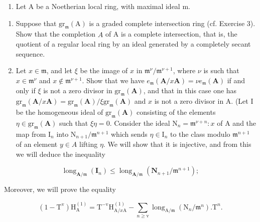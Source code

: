 \begin{enumerate}
\def\labelenumi{\arabic{enumi})}
\setcounter{enumi}{3}
\tightlist
\item
  Let A be a Noetherian local ring, with maximal ideal m.
\end{enumerate}

\begin{enumerate}
\def\labelenumi{\alph{enumi})}
\item
  Suppose that \(\mathrm{gr}_{\mathfrak{m}}(\mathrm{A})\) is a graded complete intersection ring (cf. Exercise 3). Show that the completion \(\widehat{A}\) of A is a complete intersection, that is, the quotient of a regular local ring by an ideal generated by a completely secant sequence.
\item
  Let \(x \in \mathfrak{m}\), and let \(\xi\) be the image of \(x\) in \(\mathfrak{m}^{\nu}/\mathfrak{m}^{\nu+1}\), where \(\nu\) is such that \(x \in \mathfrak{m}^{\nu}\) and \(x \notin \mathfrak{m}^{\nu+1}\). Show that we have \(e_{\mathfrak{m}}(\mathbf{A}/x\mathbf{A}) = \nu e_{\mathfrak{m}}(\mathbf{A})\) if and only if \(\xi\) is not a zero divisor in \(\mathrm{gr}_{\mathfrak{m}}(\mathbf{A})\), and that in this case one has \(\mathrm{gr}_{\mathfrak{m}}(\mathbf{A}/x\mathbf{A}) = \mathrm{gr}_{\mathfrak{m}}(\mathbf{A})/\xi\mathrm{gr}_{\mathfrak{m}}(\mathbf{A})\) and \(x\) is not a zero divisor in A. (Let I be the homogeneous ideal of \(\mathrm{gr}_{\mathfrak{m}}(\mathbf{A})\) consisting of the elements \(\eta \in \mathrm{gr}_{\mathfrak{m}}(\mathbf{A})\) such that \(\xi\eta = 0\). Consider the ideal \(\mathrm{N}_n = \mathfrak{m}^{\nu+n}:x\) of A and the map from \(\mathrm{I}_n\) into \(\mathrm{N}_{n+1}/\mathfrak{m}^{n+1}\) which sends \(\eta \in \mathrm{I}_n\) to the class modulo \(\mathfrak{m}^{n+1}\) of an element \(y \in A\) lifting \(\eta\). We will show that it is injective, and from this we will deduce the inequality
\end{enumerate}

\[
\operatorname{long} _ {\mathbf {A} / \mathfrak {m}} (\mathbf {I} _ {n}) \leqslant \operatorname{long} _ {\mathbf {A} / \mathfrak {m}} (\mathbf {N} _ {n + 1} / \mathfrak {m} ^ {n + 1});\tag{i}
\]

Moreover, we will prove the equality

\[
(1 - \mathrm{T} ^ {\mathrm{v}}) \mathrm{H} _ {\mathrm{A}} ^ {(1)} = \mathrm{T} ^ {- \mathrm{v}} \mathrm{H} _ {\mathrm{A} / x \mathrm{A}} ^ {(1)} - \sum_ {n \geqslant \mathrm{v}} \operatorname{long} _ {\mathrm{A} / \mathfrak {m}} (\mathrm{N} _ {n} / \mathfrak {m} ^ {n}). \mathrm{T} ^ {n}.\tag{ii}
\]

